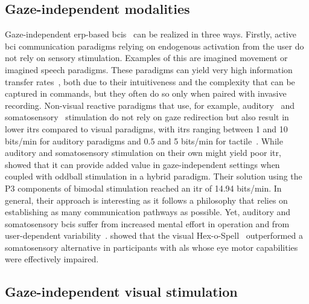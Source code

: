 \subsection{Gaze-independent modalities}
Gaze-independent \ac{erp}-based \acp{bci}~\cite{Riccio2012, Aloise2012} can be realized in three
ways.
Firstly, active \ac{bci} communication paradigms relying on endogenous activation from the user
do not rely on sensory stimulation.
Examples of this are imagined movement or imagined speech paradigms.
These paradigms can yield very high information transfer
rates~\cite{Willett2021,Metzger2023}, both due to their intuitiveness and the
complexity that can be captured in commands, but they often do so only when paired
with invasive recording.
Non-visual reactive paradigms that use, for example, auditory~\cite{Halder2010} and
somatosensory~\cite{Brouwer2010}
stimulation do not rely on gaze redirection but also result in lower \acp{itr}
compared to visual paradigms, with \acp{itr} ranging between 1 and 10 bits/min
for auditory paradigms and 0.5 and 5 bits/min for tactile~\cite{Riccio2012}.
While auditory and somatosensory stimulation on their own might yield poor
\ac{itr}, \textcite{Yin2016} showed that it can provide added value in gaze-independent
settings when coupled with oddball stimulation in a hybrid paradigm.
Their solution using the P3 components of bimodal stimulation reached an \ac{itr} of 14.94 bits/min.
In general, their approach is interesting as it follows a philosophy that
relies on establishing as many communication pathways as possible.
Yet, auditory and somatosensory \acp{bci} suffer from increased mental effort in
operation and from user-dependent
variability~\cite{Severens2014,Reichert2020b}.
\textcite{Severens2014} showed that the visual Hex-o-Spell~\cite{Treder2010}
outperformed a somatosensory alternative in participants with \ac{als} whose
eye motor capabilities were effectively impaired.

\subsection{Gaze-independent visual stimulation}
\label{sec:gaze-independence/sota/visual}

